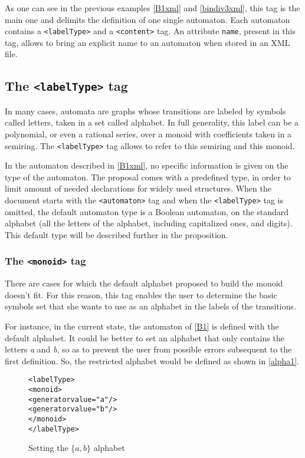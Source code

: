 \documentclass[a4paper]{article}
\newcommand{\xtag}[1]{\texttt{<#1>}}
\newcommand{\xattr}[1]{\texttt{#1}}
\begin{document}
As one can see in the previous examples \autoref{B1xml} and
\autoref{bindiv3xml}, this tag is the main one and delimits the definition of
one single automaton. Each automaton contains a \xtag{labelType} and a
\xtag{content} tag. An attribute \xattr{name}, present in this tag, allows to
bring an explicit name to an automaton when stored in an XML file.

\subsection{The \xtag{labelType} tag}

In many cases, automata are graphs whose transitions are labeled by
symbols called letters, taken in a set called alphabet. In full
generality, this label can be a polynomial, or even a rational series,
over a monoid with coefficients taken in a semiring. The \xtag{labelType}
tag allows to refer to this semiring and this monoid.

In the automaton described in \autoref{B1xml}, no specific information
is given on the type of the automaton. The proposal comes with a predefined
type, in order to limit amount of needed declarations
for widely used structures. When the document starts with the
\xtag{automaton} tag and when the \xtag{labelType} tag is omitted, the
default automaton type is a Boolean automaton, on the standard
alphabet (all the letters of the alphabet, including capitalized ones,
and digits). This default type will be described further in the proposition.

\subsubsection{The \xtag{monoid} tag}

There are cases for which the default alphabet proposed to build the
monoid doesn't fit. For this reason, this tag enables the user to
determine the basic symbols set that she wants to use as an alphabet
in the labels of the transitions.

For instance, in the current state, the automaton of \autoref{B1} is
defined with the default alphabet. It could be better to set an
alphabet that only contains the letters \textit{a} and \textit{b}, so
as to prevent the user from possible errors subsequent to the first
definition. So, the restricted alphabet would be defined as shown in
\autoref{alpha1}.

\begin{figure}[ht]
  \small
  \begin{center}
\begin{alltt}
<labelType>
  <monoid>
     <generator value="a"/>
     <generator value="b"/>
  </monoid>
</labelType>
\end{alltt}

\caption{Setting the $\{a, b\}$ alphabet}
\label{alpha1}
  \end{center}
\end{figure}
\end{document}

